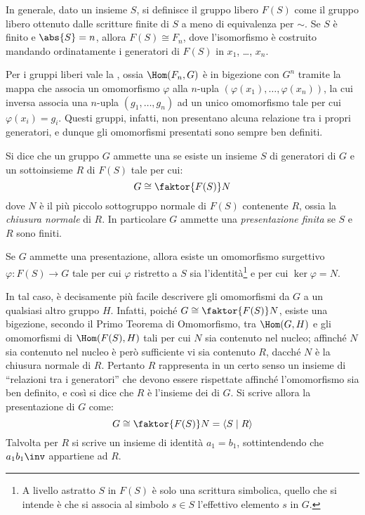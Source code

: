 \documentclass[11pt]{scrartcl}
\begin{document}
	
	\begin{remark}
		In generale, dato un insieme $S$, si definisce
		il gruppo libero $F(S)$ come il gruppo libero ottenuto
		dalle scritture finite di $S$ a meno di equivalenza per
		$\sim$. Se $S$ è finito e $\abs{S} = n$, allora
		$F(S) \cong F_n$, dove l'isomorfismo è costruito mandando
		ordinatamente i generatori di $F(S)$ in
		$x_1$, \ldots, $x_n$.
	\end{remark}
	
	
	Per i gruppi liberi vale la ,
	ossia $\Hom(F_n, G)$ è in bigezione con $G^n$ tramite
	la mappa che associa un omomorfismo $\varphi$ alla $n$-upla
	$(\varphi(x_1), \ldots, \varphi(x_n))$, la cui inversa associa
	una $n$-upla $(g_1, \ldots, g_n)$ ad un unico omomorfismo
	tale per cui $\varphi(x_i) = g_i$. Questi gruppi, infatti,
	non presentano alcuna relazione tra i propri generatori,
	e dunque gli omomorfismi presentati sono sempre ben definiti. \medskip
	
	
	\begin{definition}
		Si dice che un gruppo $G$ ammette una  se esiste un insieme $S$ di generatori di $G$ e un sottoinsieme $R$ di $F(S)$ tale per cui:
		\[ G \cong \faktor{F(S)}N \]
		dove $N$ è il più piccolo sottogruppo normale di
		$F(S)$ contenente $R$, ossia la \textit{chiusura normale}
		di $R$. In particolare $G$ ammette una \textit{presentazione finita} se $S$ e $R$ sono finiti.
	\end{definition}
	\medskip
	
	
	Se $G$ ammette una presentazione, allora esiste un
	omomorfismo surgettivo $\varphi : F(S) \to G$ tale
	per cui $\varphi$ ristretto a $S$ sia l'identità\footnote{
		A livello astratto $S$ in $F(S)$ è solo una scrittura
		simbolica, quello che si intende è che si associa
		al simbolo $s \in S$ l'effettivo elemento $s$ in
		$G$.
	} e per cui $\ker \varphi = N$. \medskip
	
	
	In tal caso, è decisamente più facile descrivere gli
	omomorfismi da $G$ a un qualsiasi altro gruppo $H$.
	Infatti, poiché $G \cong \faktor{F(S)}N$, esiste una bigezione,
	secondo il Primo Teorema di Omomorfismo, tra
	$\Hom(G, H)$ e gli omomorfismi di $\Hom(F(S), H)$ tali
	per cui $N$ sia contenuto nel nucleo; affinché $N$
	sia contenuto nel nucleo è però sufficiente
	vi sia contenuto $R$, dacché $N$ è la chiusura normale
	di $R$. Pertanto $R$ rappresenta in un certo senso un
	insieme di ``relazioni tra i generatori'' che devono
	essere rispettate affinché l'omomorfismo sia ben definito, e
	così si dice che $R$ è l'insieme dei  di $G$.
	Si scrive allora la presentazione di $G$ come:
	\[ G \cong \faktor{F(S)}N = \langle S \mid R \rangle \]
	Talvolta per $R$ si scrive un insieme di identità
	$a_1 = b_1$, sottintendendo che
	$a_1 b_1\inv$ appartiene ad $R$.
	
\end{document}
